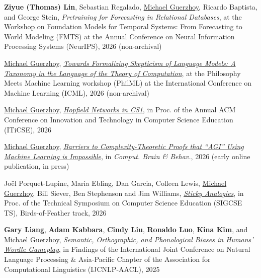 \documentclass[letterpaper,11pt]{article}
\begin{document}
\begin{revnumerate}
\item
\textbf{Ziyue (Thomas) Lin}, Sebastian Regalado, \underline{Michael Guerzhoy}, Ricardo Baptista, and George Stein, \textit{Pretraining for Forecasting in Relational Databases}, at the Workshop on Foundation Models for Temporal Systems: From Forecasting to World Modeling (FMTS) at the Annual Conference on Neural Information Processing Systems (NeurIPS), 2026 (non-archival)

\item
\underline{Michael Guerzhoy}, \href{https://www.cs.toronto.edu/~guerzhoy/philML_ICML26.pdf}{\textit{Towards Formalizing Skepticism of Language Models: A Taxonomy in the Language of the Theory of Computation}}, at the Philosophy Meets Machine Learning workshop (PhilML) at the International Conference on Machine Learning (ICML), 2026 (non-archival)

\item
\underline{Michael Guerzhoy}, \href{https://dl.acm.org/doi/10.1145/3803401.3811984}{\textit{Hopfield Networks in CS1}}, in Proc. of the Annual ACM Conference on Innovation and Technology in Computer Science Education (ITiCSE), 2026

\item
    \underline{Michael Guerzhoy}, \href{https://link.springer.com/article/10.1007/s42113-026-00284-w}{\textit{Barriers to Complexity-Theoretic Proofs that ``AGI'' Using Machine Learning is Impossible}}, in \textit{Comput. Brain \& Behav.}, 2026 (early online publication, in press)

\item
    Joël Porquet-Lupine, Maria Ebling, Dan Garcia, Colleen Lewis, \underline{Michael Guerzhoy}, Bill Siever, Ben Stephenson and Jim Williams, \href{https://doi.org/10.1145/3770761.3777083}{\textit{Sticky Analogies}}, in Proc. of the  Technical Symposium on Computer Science Education (SIGCSE TS), Birds-of-Feather track, 2026 

\item \textbf{Gary Liang}, \textbf{Adam Kabbara}, \textbf{Cindy Liu}, \textbf{Ronaldo Luo}, \textbf{Kina Kim}, and \underline{Michael Guerzhoy}, \href{https://aclanthology.org/2025.findings-ijcnlp.67/}{\textit{Semantic, Orthographic, and Phonological Biases in Humans' Wordle Gameplay}}, in  Findings of the International Joint Conference on Natural Language Processing \& Asia-Pacific Chapter of the Association for Computational Linguistics (IJCNLP-AACL), 2025


\end{revnumerate}
\end{document}

